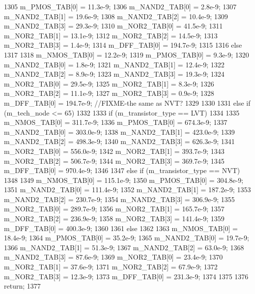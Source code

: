\begin{DoxyCode}
{{{1305             m_PMOS_TAB[0] = 11.3e-9;
1306             m_NAND2_TAB[0] = 2.8e-9;
1307             m_NAND2_TAB[1] = 19.6e-9;
1308             m_NAND2_TAB[2] = 10.4e-9;
1309             m_NAND2_TAB[3] = 29.3e-9;
1310             m_NOR2_TAB[0] = 41.5e-9;
1311             m_NOR2_TAB[1] = 13.1e-9;
1312             m_NOR2_TAB[2] = 14.5e-9;
1313             m_NOR2_TAB[3] = 1.4e-9;
1314             m_DFF_TAB[0] = 194.7e-9;
1315         }
1316         else
1317         {
1318             m_NMOS_TAB[0] = 12.2e-9;
1319             m_PMOS_TAB[0] = 9.3e-9;
1320             m_NAND2_TAB[0] = 1.8e-9;
1321             m_NAND2_TAB[1] = 12.4e-9;
1322             m_NAND2_TAB[2] = 8.9e-9;
1323             m_NAND2_TAB[3] = 19.3e-9;
1324             m_NOR2_TAB[0] = 29.5e-9;
1325             m_NOR2_TAB[1] = 8.3e-9;
1326             m_NOR2_TAB[2] = 11.1e-9;
1327             m_NOR2_TAB[3] = 0.9e-9;
1328             m_DFF_TAB[0] = 194.7e-9; //FIXME-the same as NVT?
1329         }
1330     }
1331     else if (m_tech_node <= 65)
1332     {
1333         if (m_transistor_type == LVT)
1334         {
1335             m_NMOS_TAB[0] = 311.7e-9;
1336             m_PMOS_TAB[0] = 674.3e-9;
1337             m_NAND2_TAB[0] = 303.0e-9;
1338             m_NAND2_TAB[1] = 423.0e-9;
1339             m_NAND2_TAB[2] = 498.3e-9;
1340             m_NAND2_TAB[3] = 626.3e-9;
1341             m_NOR2_TAB[0] = 556.0e-9;
1342             m_NOR2_TAB[1] = 393.7e-9;
1343             m_NOR2_TAB[2] = 506.7e-9;
1344             m_NOR2_TAB[3] = 369.7e-9;
1345             m_DFF_TAB[0] = 970.4e-9;
1346         }
1347         else if (m_transistor_type == NVT)
1348         {
1349             m_NMOS_TAB[0] = 115.1e-9;
1350             m_PMOS_TAB[0] = 304.8e-9;
1351             m_NAND2_TAB[0] = 111.4e-9;
1352             m_NAND2_TAB[1] = 187.2e-9;
1353             m_NAND2_TAB[2] = 230.7e-9;
1354             m_NAND2_TAB[3] = 306.9e-9;
1355             m_NOR2_TAB[0] = 289.7e-9;
1356             m_NOR2_TAB[1] = 165.7e-9;
1357             m_NOR2_TAB[2] = 236.9e-9;
1358             m_NOR2_TAB[3] = 141.4e-9;
1359             m_DFF_TAB[0] = 400.3e-9;
1360         }
1361         else
1362         {
1363             m_NMOS_TAB[0] = 18.4e-9;
1364             m_PMOS_TAB[0] = 35.2e-9;
1365             m_NAND2_TAB[0] = 19.7e-9;
1366             m_NAND2_TAB[1] = 51.3e-9;
1367             m_NAND2_TAB[2] = 63.0e-9;
1368             m_NAND2_TAB[3] = 87.6e-9;
1369             m_NOR2_TAB[0] = 23.4e-9;
1370             m_NOR2_TAB[1] = 37.6e-9;
1371             m_NOR2_TAB[2] = 67.9e-9;
1372             m_NOR2_TAB[3] = 12.3e-9;
1373             m_DFF_TAB[0] = 231.3e-9;
1374         }
1375     }
1376     return;
1377 }
\end{DoxyCode}
